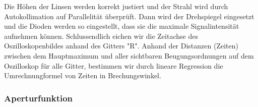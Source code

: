 Die H\"ohen der Linsen werden korrekt justiert und der Strahl wird durch Autokollimation auf Parallelit\"at \"uberpr\"uft. Dann wird der Drehspiegel eingesetzt und die Dioden werden so eingestellt, dass sie die maximale Signalintensit\"at aufnehmen k\"onnen. Schlussendlich eichen wir die Zeitachse des Oszilloskopenbildes anhand des Gitters "R". Anhand der Distanzen (Zeiten) zwischen dem Hauptmaximum und aller sichtbaren Beugungsordnungen auf dem Oszilloskop f\"ur alle Gitter, bestimmen wir durch lineare Regression die Umrechnungformel von Zeiten in Brechungswinkel.

\subsubsection{Aperturfunktion}

\clearpage